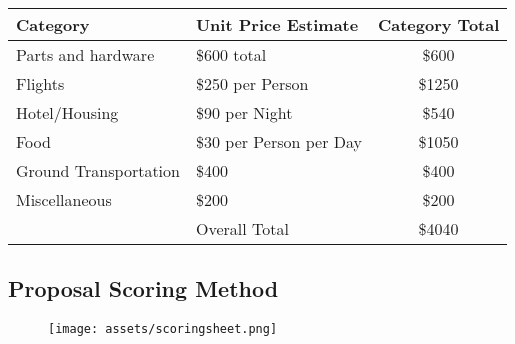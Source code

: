 \documentclass{article}
\let\Oldsection\section
\renewcommand{\section}{\FloatBarrier\Oldsection}
\let\Oldsubsection\subsection
\renewcommand{\subsection}{\FloatBarrier\Oldsubsection}
\begin{document}
\bigskip
\bigskip

\begin{tabular}{||l l c||} 
  \hline
  Category & Unit Price Estimate & Category Total \\ [0.5ex]
  \hline\hline
  Parts and hardware & \$600 total & \$600 \\ 
  \hline
  Flights & \$250 per Person & \$1250 \\ 
  \hline
  Hotel/Housing & \$90 per Night & \$540 \\
  \hline
  Food & \$30 per Person per Day & \$1050 \\
  \hline
  Ground Transportation & \$400 & \$400 \\
  \hline
  Miscellaneous & \$200 & \$200 \\
  \hline
   & Overall Total & \$4040 \\
  \hline
 \end{tabular}
 
\pagebreak

\subsection{Proposal Scoring Method}

\begin{figure}[!htb]
  \centering
  \texttt{[image: assets/scoringsheet.png]}
\end{figure}

\pagebreak

\newcommand{\raritansection}{

\section{Appendices}

\subsection{Raritan Confirmation letter}

This letter from Raritan High School in Hazlet, NJ, certifies the intent of our team to engage in an outreach program. As team member John Cinquegrana is an alumni of RHS he headed discussions with them. The RHS side of discussions was headed by Mr. Michael Miller (mmiller@hazlet.org) as described in the letter.

}


\end{document}
